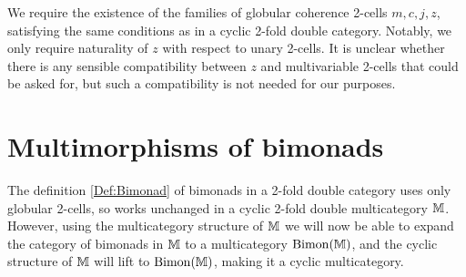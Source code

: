 We require the existence of the families of globular coherence 2-cells $m,c,j,z$, satisfying the same conditions as in a cyclic 2-fold double category. Notably, we only require naturality of $z$ with respect to unary 2-cells. It is unclear whether there is any sensible compatibility between $z$ and multivariable 2-cells that could be asked for, but such a compatibility is not needed for our purposes.

\section{Multimorphisms of bimonads}

The definition \ref{Def:Bimonad} of bimonads in a 2-fold double category uses only globular 2-cells, so works unchanged in a cyclic 2-fold double multicategory $\mathbb{M}$. However, using the multicategory structure of $\mathbb{M}$ we will now be able to expand the category of bimonads in $\mathbb{M}$ to a multicategory $\mathrm{Bimon}(\mathbb{M})$, and the cyclic structure of $\mathbb{M}$ will lift to $\mathrm{Bimon}(\mathbb{M})$, making it a cyclic multicategory.

